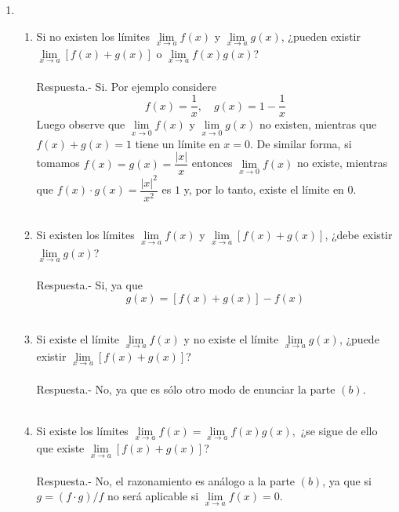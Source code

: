 \begin{enumerate}
\item 
\begin{enumerate}[\bfseries (a)]

    \item Si no existen los límites $\lim\limits_{x \to a} f(x)$ y $\lim\limits_{x \to a} g(x)$, ¿pueden existir $\lim\limits_{x \to a} [f(x)+g(x)]$ o $\lim\limits_{x \to a} f(x)g(x)$?\\\\
	Respuesta.-\; Si. Por ejemplo considere $$f(x)=\dfrac{1}{x}, \quad g(x)=1-\dfrac{1}{x}$$ 
	Luego observe que $\lim\limits_{x \to 0} f(x)$ y $\lim\limits_{x\to 0} g(x)$ no existen, mientras que $f(x)+g(x)=1$ tiene un límite en $x=0$. De similar forma, si tomamos $f(x)=g(x)=\dfrac{|x|}{x}$ entonces $\lim\limits_{x\to 0} f(x)$ no existe, mientras que $f(x)\cdot g(x)=\dfrac{|x|^2}{x^2}$ es $1$ y, por lo tanto, existe el límite en $0$.\\\\

    \item Si existen los límites $\lim\limits_{x\to a} f(x)$ y  $\lim\limits_{x\to a} [f(x) + g(x)]$, ¿debe existir $\lim\limits_{x\to a} g(x)$?\\\\
	Respuesta.-\; Si, ya que $$g(x)=[f(x)+g(x)]-f(x)$$\\

    \item Si existe el límite $\lim\limits_{x\to a}f(x)$ y no existe el límite $\lim\limits_{x\to a} g(x)$, ¿puede existir $\lim\limits_{x\to a}[f(x)+g(x)]$?\\\\
	Respuesta.-\; No, ya que es sólo otro modo de enunciar la parte $(b)$.\\\\

    \item Si existe los límites $\lim\limits_{x\to a} f(x)=\lim\limits_{x\to a} f(x)g(x),$ ¿se sigue de ello que existe $\lim\limits_{x\to a} [f(x)+g(x)]$?\\\\
	Respuesta.-\; No, el razonamiento es análogo a la parte $(b)$, ya que si $g=(f\cdot g)/f$ no será aplicable si $\lim\limits_{x\to a}f(x)=0$.\\\\ 

\end{enumerate}


\end{enumerate}
